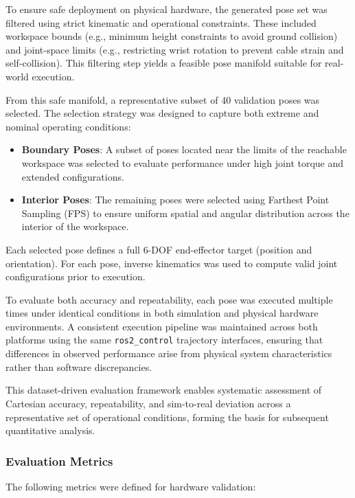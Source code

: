 \documentclass[conference]{IEEEtran}
\begin{document}
	To ensure safe deployment on physical hardware, the generated pose set was filtered using strict kinematic and operational constraints. These included workspace bounds (e.g., minimum height constraints to avoid ground collision) and joint-space limits (e.g., restricting wrist rotation to prevent cable strain and self-collision). This filtering step yields a feasible pose manifold suitable for real-world execution.
	
	From this safe manifold, a representative subset of 40 validation poses was selected. The selection strategy was designed to capture both extreme and nominal operating conditions:
	
	\begin{itemize}
		\item \textbf{Boundary Poses}: A subset of poses located near the limits of the reachable workspace was selected to evaluate performance under high joint torque and extended configurations.
		
		\item \textbf{Interior Poses}: The remaining poses were selected using Farthest Point Sampling (FPS) to ensure uniform spatial and angular distribution across the interior of the workspace.
	\end{itemize}
	
	Each selected pose defines a full 6-DOF end-effector target (position and orientation). For each pose, inverse kinematics was used to compute valid joint configurations prior to execution.
	
	To evaluate both accuracy and repeatability, each pose was executed multiple times under identical conditions in both simulation and physical hardware environments. A consistent execution pipeline was maintained across both platforms using the same \texttt{ros2\_control} trajectory interfaces, ensuring that differences in observed performance arise from physical system characteristics rather than software discrepancies.
	
	This dataset-driven evaluation framework enables systematic assessment of Cartesian accuracy, repeatability, and sim-to-real deviation across a representative set of operational conditions, forming the basis for subsequent quantitative analysis.
	
	\subsubsection{Evaluation Metrics}
	
	The following metrics were defined for hardware validation:
	
\end{document}

